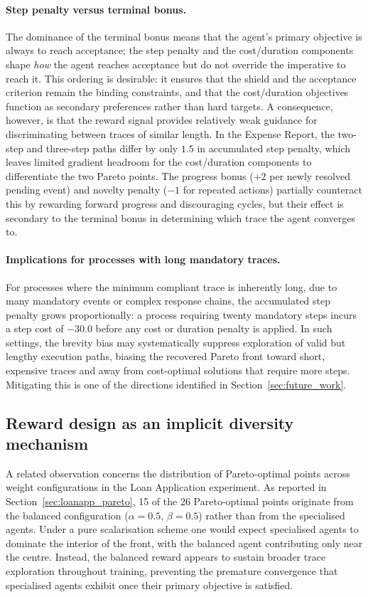 \paragraph{Step penalty versus terminal bonus.} The dominance of the terminal bonus means that the agent's primary objective is always to reach acceptance; the step penalty and the cost/duration components shape \emph{how} the agent reaches acceptance but do not override the imperative to reach it. This ordering is desirable: it ensures that the shield and the acceptance criterion remain the binding constraints, and that the cost/duration objectives function as secondary preferences rather than hard targets. A consequence, however, is that the reward signal provides relatively weak guidance for discriminating between traces of similar length. In the Expense Report, the two-step and three-step paths differ by only $1.5$ in accumulated step penalty, which leaves limited gradient headroom for the cost/duration components to differentiate the two Pareto points. The progress bonus ($+2$ per newly resolved pending event) and novelty penalty ($-1$ for repeated actions) partially counteract this by rewarding forward progress and discouraging cycles, but their effect is secondary to the terminal bonus in determining which trace the agent converges to.

\paragraph{Implications for processes with long mandatory traces.} For processes where the minimum compliant trace is inherently long, due to many mandatory events or complex response chains, the accumulated step penalty grows proportionally: a process requiring twenty mandatory steps incurs a step cost of $-30.0$ before any cost or duration penalty is applied. In such settings, the brevity bias may systematically suppress exploration of valid but lengthy execution paths, biasing the recovered Pareto front toward short, expensive traces and away from cost-optimal solutions that require more steps. Mitigating this is one of the directions identified in Section~\ref{sec:future_work}.

\subsection{Reward design as an implicit diversity mechanism}
\label{sec:discussion_diversity}

A related observation concerns the distribution of Pareto-optimal points across weight configurations in the Loan Application experiment. As reported in Section~\ref{sec:loanapp_pareto}, 15 of the 26 Pareto-optimal points originate from the balanced configuration ($\alpha=0.5,\,\beta=0.5$) rather than from the specialised agents. Under a pure scalarisation scheme one would expect specialised agents to dominate the interior of the front, with the balanced agent contributing only near the centre. Instead, the balanced reward appears to sustain broader trace exploration throughout training, preventing the premature convergence that specialised agents exhibit once their primary objective is satisfied.

